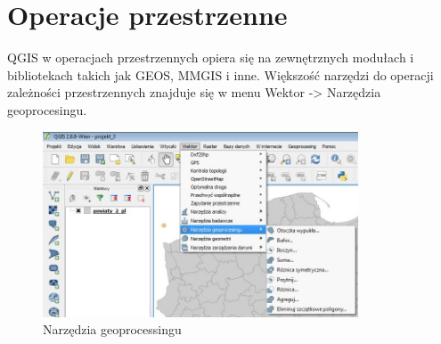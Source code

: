 \documentclass[12pt,a4paper]{book}
\begin{document}
\section{Operacje przestrzenne}
QGIS w operacjach przestrzennych opiera się na zewnętrznych modułach i bibliotekach takich jak GEOS, MMGIS i inne. Większość narzędzi do operacji zależności przestrzennych znajduje się w menu Wektor -{\textgreater} Narzędzia geoprocesingu.

\begin{center}
\begin{figure}
\caption{Narzędzia geoprocessingu}
\includegraphics[width=9.37cm,height=5.514cm]{003-geoprocessing.jpg}
\end{figure}
\end{center}
\end{document}
